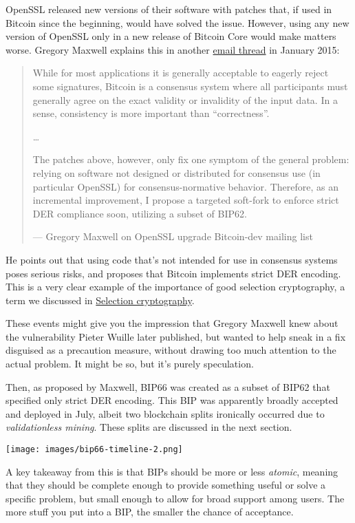 OpenSSL released new versions of their software with patches that, if
used in Bitcoin since the beginning, would have solved the issue.
However, using any new version of OpenSSL only in a new release of
Bitcoin Core would make matters worse. Gregory Maxwell explains this in
another
\href{https://lists.linuxfoundation.org/pipermail/bitcoin-dev/2015-January/007097.html}{email
thread} in January 2015:

\begin{quote}
While for most applications it is generally acceptable to eagerly reject
some signatures, Bitcoin is a consensus system where all participants
must generally agree on the exact validity or invalidity of the input
data. In a sense, consistency is more important than ``correctness''.

\ldots\hspace{0pt}

The patches above, however, only fix one symptom of the general problem:
relying on software not designed or distributed for consensus use (in
particular OpenSSL) for consensus-normative behavior. Therefore, as an
incremental improvement, I propose a targeted soft-fork to enforce
strict DER compliance soon, utilizing a subset of BIP62.

---  Gregory Maxwell on OpenSSL upgrade Bitcoin-dev mailing list
\end{quote}

He points out that using code that's not intended for use in consensus
systems poses serious risks, and proposes that Bitcoin implements strict
DER encoding. This is a very clear example of the importance of good
selection cryptography, a term we discussed in
\protect\hyperlink{selectioncryptography}{Selection cryptography}.

These events might give you the impression that Gregory Maxwell knew
about the vulnerability Pieter Wuille later published, but wanted to
help sneak in a fix disguised as a precaution measure, without drawing
too much attention to the actual problem. It might be so, but it's
purely speculation.

Then, as proposed by Maxwell, BIP66 was created as a subset of BIP62
that specified only strict DER encoding. This BIP was apparently broadly
accepted and deployed in July, albeit two blockchain splits ironically
occurred due to \emph{validationless mining}. These splits are discussed
in the next section.

\texttt{[image: images/bip66-timeline-2.png]}

A key takeaway from this is that BIPs should be more or less
\emph{atomic}, meaning that they should be complete enough to provide
something useful or solve a specific problem, but small enough to allow
for broad support among users. The more stuff you put into a BIP, the
smaller the chance of acceptance.

